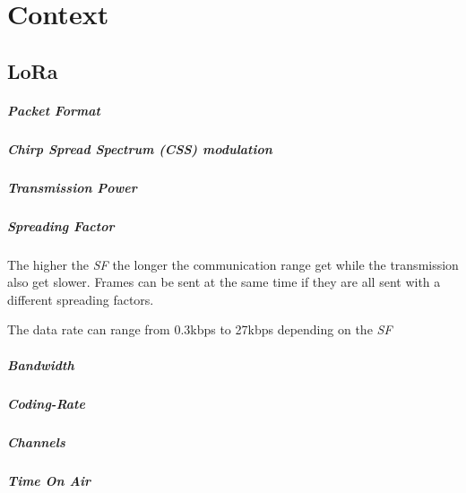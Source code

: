 \chapter{Context}


\section{LoRa}

\label{section:lora}

\paragraph{Packet Format}
\paragraph{Chirp Spread Spectrum (CSS) modulation}
\paragraph{Transmission Power}
\paragraph{Spreading Factor}

The higher the \emph{SF} the longer the communication range get while the
transmission also get slower. Frames can be sent at the same time if they are
all sent with a different spreading factors\cite{8030482}.

The data rate can range from 0.3kbps to 27kbps depending on the \emph{SF} %

\paragraph{Bandwidth}
\paragraph{Coding-Rate}
\paragraph{Channels}


\paragraph{Time On Air}

